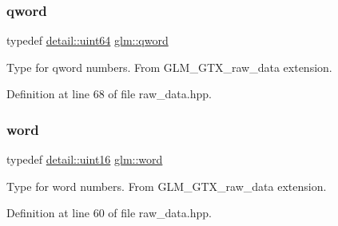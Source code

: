 \subsubsection{\texorpdfstring{qword}{qword}}
{\footnotesize\ttfamily typedef \hyperlink{namespaceglm_1_1detail_adec4b19bf4982125e122db2fe03c5810}{detail\+::uint64} \hyperlink{group__gtx__raw__data_ga32447af289e879589883c9b7e3be1246}{glm\+::qword}}

Type for qword numbers. From G\+L\+M\+\_\+\+G\+T\+X\+\_\+raw\+\_\+data extension. 

Definition at line 68 of file raw\+\_\+data.\+hpp.

\mbox{\label{group__gtx__raw__data_ga5617a479d471021b5c773c5e969ba46d}} 
\subsubsection{\texorpdfstring{word}{word}}
{\footnotesize\ttfamily typedef \hyperlink{namespaceglm_1_1detail_a47b2a7d006d187338e8031a352d1ce56}{detail\+::uint16} \hyperlink{group__gtx__raw__data_ga5617a479d471021b5c773c5e969ba46d}{glm\+::word}}

Type for word numbers. From G\+L\+M\+\_\+\+G\+T\+X\+\_\+raw\+\_\+data extension. 

Definition at line 60 of file raw\+\_\+data.\+hpp.

